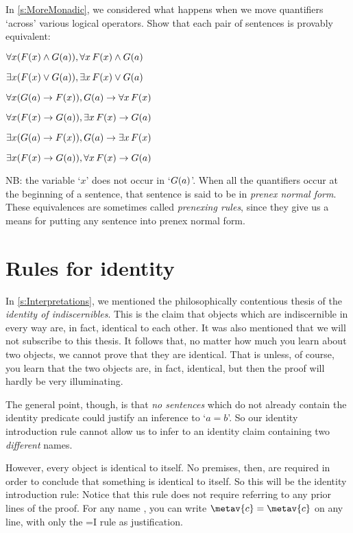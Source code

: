 \problempart
In \cref{s:MoreMonadic}, we considered what happens when we move quantifiers `across' various logical operators. Show that each pair of sentences is provably equivalent:
\begin{compactlist}
\item $\forall x(F(x) \wedge G(a)), \forall x\,F(x) \wedge G(a)$
\item $\exists x(F(x) \vee G(a)), \exists x\,F(x) \vee G(a)$
\item $\forall x(G(a) \rightarrow F(x)), G(a) \rightarrow \forall x\,F(x)$
\item $\forall x(F(x) \rightarrow G(a)), \exists x\,F(x) \rightarrow G(a)$
\item $\exists x(G(a) \rightarrow F(x)), G(a) \rightarrow \exists x\,F(x)$
\item $\exists x(F(x) \rightarrow G(a)), \forall x\,F(x) \rightarrow G(a)$
\end{compactlist}
NB: the variable `$x$' does not occur in `$G(a)$'. When all the quantifiers occur at the beginning of a sentence, that sentence is said to be in \emph{prenex normal form}. These equivalences are sometimes called \emph{prenexing rules}, since they give us a means for putting any sentence into prenex normal form.


\chapter{Rules for identity}
In \cref{s:Interpretations}, we mentioned the philosophically contentious thesis of the \emph{identity of indiscernibles}. This is the claim that objects which are indiscernible in every way are, in fact, identical to each other. It was also mentioned that we will not subscribe to this thesis. It follows that, no matter how much you learn about two objects, we cannot prove that they are identical. That is unless, of course, you learn that the two objects are, in fact, identical, but then the proof will hardly be very illuminating.

The general point, though, is that \emph{no sentences} which do not already contain the identity predicate could justify an inference to `$a=b$'. So our identity introduction rule cannot allow us to infer to an identity claim containing two \emph{different} names.

However, every object is identical to itself. No premises, then, are required in order to conclude that something is identical to itself. So this will be the identity introduction rule:
Notice that this rule does not require referring to any prior lines of the proof. For any name , you can write $\metav{c}=\metav{c}$ on any line, with only the {=}I rule as justification.

